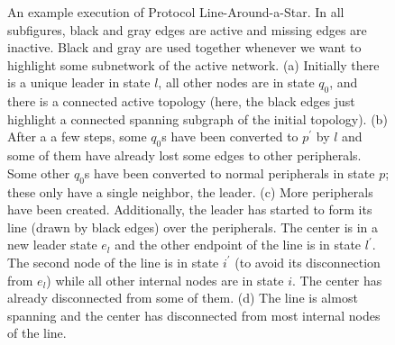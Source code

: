 \documentclass[preprint]{elsarticle}
\begin{document}
\begin{figure}[!hbtp]
   \caption{An example execution of Protocol Line-Around-a-Star. In all subfigures, black and gray edges are active and missing edges are inactive. Black and gray are used together whenever we want to highlight some subnetwork of the active network. (a) Initially there is a unique leader in state $l$, all other nodes are in state $q_0$, and there is a connected active topology (here, the black edges just highlight a connected spanning subgraph of the initial topology). (b) After a a few steps, some $q_0$s have been converted to $p^\prime$ by $l$ and some of them have already lost some edges to other peripherals. Some other $q_0$s have been converted to normal peripherals in state $p$; these only have a single neighbor, the leader. (c) More peripherals have been created. Additionally, the leader has started to form its line (drawn by black edges) over the peripherals. The center is in a new leader state $e_l$ and the other endpoint of the line is in state $l^\prime$. The second node of the line is in state $i^\prime$ (to avoid its disconnection from $e_l$) while all other internal nodes are in state $i$. The center has already disconnected from some of them. (d) The line is almost spanning and the center has disconnected from most internal nodes of the line.} \label{fig:around-a-star}
\end{figure}
\end{document}
